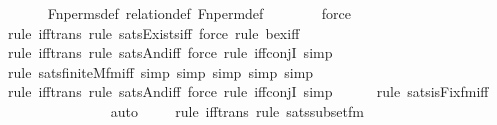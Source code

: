 \begin{isabellebody}
\ \ \ \ \isamarkupfalse%
\ Fn{\isacharunderscore}{\kern0pt}perms{\isacharunderscore}{\kern0pt}def\ relation{\isacharunderscore}{\kern0pt}def\ Fn{\isacharunderscore}{\kern0pt}perm{\isacharprime}{\kern0pt}{\isacharunderscore}{\kern0pt}def\ \isanewline
\ \ \ \ \ \isamarkupfalse%
\ force\isanewline
\ \ \ \ \isamarkupfalse%
{\isacharparenleft}{\kern0pt}rule\ iff{\isacharunderscore}{\kern0pt}trans{\isacharcomma}{\kern0pt}\ rule\ sats{\isacharunderscore}{\kern0pt}Exists{\isacharunderscore}{\kern0pt}iff{\isacharcomma}{\kern0pt}\ force{\isacharcomma}{\kern0pt}\ rule\ bex{\isacharunderscore}{\kern0pt}iff{\isacharparenright}{\kern0pt}{\isacharplus}{\kern0pt}\isanewline
\ \ \ \ \isamarkupfalse%
{\isacharparenleft}{\kern0pt}rule\ iff{\isacharunderscore}{\kern0pt}trans{\isacharcomma}{\kern0pt}\ rule\ sats{\isacharunderscore}{\kern0pt}And{\isacharunderscore}{\kern0pt}iff{\isacharcomma}{\kern0pt}\ force{\isacharcomma}{\kern0pt}\ rule\ iff{\isacharunderscore}{\kern0pt}conjI{}{\isacharcomma}{\kern0pt}\ simp{\isacharparenright}{\kern0pt}{\isacharplus}{\kern0pt}\isanewline
\ \ \ \ \isamarkupfalse%
{\isacharparenleft}{\kern0pt}rule\ sats{\isacharunderscore}{\kern0pt}finite{\isacharunderscore}{\kern0pt}M{\isacharunderscore}{\kern0pt}fm{\isacharunderscore}{\kern0pt}iff{\isacharcomma}{\kern0pt}\ simp{\isacharcomma}{\kern0pt}\ simp{\isacharcomma}{\kern0pt}\ simp{\isacharcomma}{\kern0pt}\ simp{\isacharcomma}{\kern0pt}\ simp{\isacharparenright}{\kern0pt}\isanewline
\ \ \ \ \isamarkupfalse%
{\isacharparenleft}{\kern0pt}rule\ iff{\isacharunderscore}{\kern0pt}trans{\isacharcomma}{\kern0pt}\ rule\ sats{\isacharunderscore}{\kern0pt}And{\isacharunderscore}{\kern0pt}iff{\isacharcomma}{\kern0pt}\ force{\isacharcomma}{\kern0pt}\ rule\ iff{\isacharunderscore}{\kern0pt}conjI{}{\isacharcomma}{\kern0pt}\ simp{\isacharparenright}{\kern0pt}{\isacharplus}{\kern0pt}\isanewline
\ \ \ \ \ \isamarkupfalse%
{\isacharparenleft}{\kern0pt}rule\ sats{\isacharunderscore}{\kern0pt}is{\isacharunderscore}{\kern0pt}Fix{\isacharunderscore}{\kern0pt}fm{\isacharunderscore}{\kern0pt}iff{\isacharparenright}{\kern0pt}\isanewline
\ \ \ \ \ \ \ \ \ \ \ \ \ \isamarkupfalse%
\ auto{\isacharbrackleft}{\kern0pt}{}{\isacharbrackright}{\kern0pt}\isanewline
\ \ \ \ \isamarkupfalse%
{\isacharparenleft}{\kern0pt}rule\ iff{\isacharunderscore}{\kern0pt}trans{\isacharcomma}{\kern0pt}\ rule\ sats{\isacharunderscore}{\kern0pt}subset{\isacharunderscore}{\kern0pt}fm{\isacharparenright}{\kern0pt}\isanewline

\end{isabellebody}
